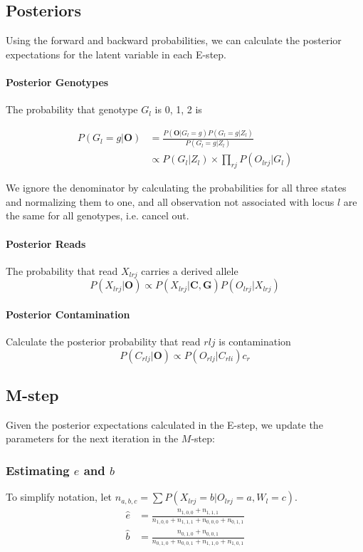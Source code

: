 \documentclass[10pt,a4paper]{article}
\newcommand{\BFG}{\mathbf{G}}
\newcommand{\BFO}{\mathbf{O}}
\newcommand{\BFC}{\mathbf{C}}
\begin{document}
\subsection*{Posteriors}
Using the forward and backward probabilities, we can calculate the posterior expectations for the latent variable in each E-step.


\paragraph{Posterior Genotypes}


The probability that genotype $G_l$ is 0, 1, 2 is 

\begin{align}
P(G_l=g|\BFO) &= \frac{P(\BFO|G_l=g)P(G_l=g|Z_l)}{P(G_l=g|Z_l)} \\	
&\propto  P(G_l | Z_l) \times \prod_{rj} P(O_{lrj} | G_l)
\end{align}

We ignore the denominator by calculating the probabilities for all three states and normalizing them to one, and all observation not associated with locus $l$ are the same for all genotypes, i.e. cancel out.


\paragraph{Posterior Reads}
The probability that read $X_{lrj}$ carries a derived allele
$$P(X_{lrj} | \BFO) \propto P(X_{lrj} | \BFC, \BFG) P(O_{lrj} | X_{lrj})$$

\paragraph{Posterior Contamination}
Calculate the posterior probability that read $rlj$ is contamination
$$P(C_{rlj}| \BFO)  \propto P(O_{rlj}|C_{rli}) c_r $$



\subsection{M-step}
Given the posterior expectations calculated in the E-step, we update the parameters for the next iteration in the $M$-step:
\subsubsection*{Estimating $e$ and $b$}
To simplify notation, let $n_{a,b,c}=\sum P(X_{lrj}=b|O_{lrj}=a, W_l=c)$.
\begin{align*}
\hat{e} & = \frac{n_{1,0,0} + n_{1,1,1}}{n_{1,0,0} + n_{1,1,1} + n_{0,0,0} +n_{0, 1, 1}}\\
\hat{b} & = \frac{n_{0,1,0} + n_{0, 0,1}}{n_{0, 1, 0} + n_{0, 0, 1} + n_{1, 1, 0} +n_{1, 0, 1}}
\end{align*}
\end{document}
